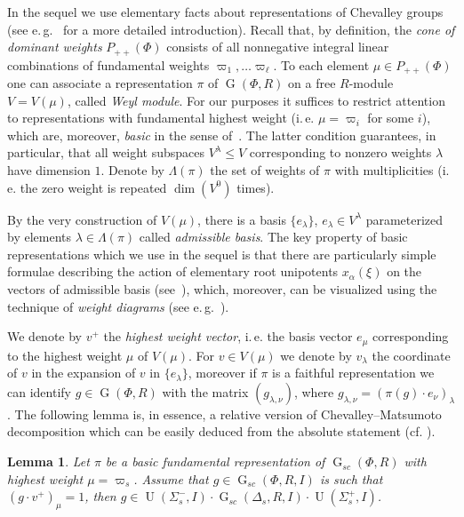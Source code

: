 \documentclass[11pt]{amsart}
\theoremstyle{plain}
\numberwithin{equation}{section}
\newtheorem{lemma}{Lemma}
\numberwithin{lemma}{section}
\theoremstyle{definition}
\theoremstyle{remark}
\DeclareMathOperator{\G}{G}
\DeclareMathOperator{\U}{U}
\begin{document}
In the sequel we use elementary facts about representations of Chevalley groups (see e.\,g.~\cite{PSV98,VP} for a more detailed introduction).
Recall that, by definition, the {\it cone of dominant weights} $P_{++}(\Phi)$ consists of all nonnegative integral linear combinations of fundamental weights $\varpi_1,\ldots \varpi_\ell$.
To each element $\mu \in P_{++}(\Phi)$ one can associate a representation $\pi$ of $\G(\Phi, R)$ on a free $R$-module $V = V(\mu)$, called {\it Weyl module}.
For our purposes it suffices to restrict attention to representations with fundamental highest weight (i.\,e. $\mu=\varpi_i$ for some $i$), which are, moreover, {\it basic} in the sense of~\cite[\S~I.2]{Ma69}.
The latter condition guarantees, in particular, that all weight subspaces $V^\lambda \leq V$ corresponding to nonzero weights $\lambda$ have dimension $1$.
Denote by $\Lambda(\pi)$ the set of weights of $\pi$ with multiplicities (i.\,e. the zero weight is repeated $\dim(V^0)$ times).

By the very construction of $V(\mu)$, there is a basis $\{e_\lambda\}$, $e_\lambda\in V^\lambda$ parameterized by elements $\lambda\in\Lambda(\pi)$ called {\it admissible basis}.
The key property of basic representations which we use in the sequel is that there are particularly simple formulae describing the action
 of elementary root unipotents $x_\alpha(\xi)$ on the vectors of admissible basis (see~\cite[Lemme~2.3]{Ma69}),
 which, moreover, can be visualized using the technique of {\it weight diagrams} (see e.\,g.~\cite{PSV98}).
 
We denote by $v^+$ the {\it highest weight vector}, i.\,e. the basis vector $e_\mu$ corresponding to the highest weight $\mu$ of $V(\mu)$.
For $v\in V(\mu)$ we denote by $v_\lambda$ the coordinate of $v$ in the expansion of $v$ in $\{e_\lambda\}$, moreover if $\pi$ is a faithful representation we can 
identify $g\in \G(\Phi, R)$ with the matrix $(g_{\lambda, \nu})$, where $g_{\lambda, \nu} = (\pi(g)\cdot e_\nu)_{\lambda}$.
The following lemma is, in essence, a relative version of Chevalley--Matsumoto decomposition which can be easily deduced from the absolute statement (cf. \cite[Theorem~1.3]{St78}).
\begin{lemma}\label{lemma:Chevalley-Matsumoto}
Let $\pi$ be a basic fundamental representation of $\G_{sc}(\Phi, R)$ with highest weight $\mu = \varpi_s$.
Assume that $g\in \G_{sc}(\Phi, R, I)$ is such that $(g\cdot v^+)_{\mu}=1$, then $g \in \U(\Sigma_s^-, I) \cdot \G_{sc}(\Delta_s, R, I) \cdot \U(\Sigma_s^+, I)$. \end{lemma}
\end{document}
